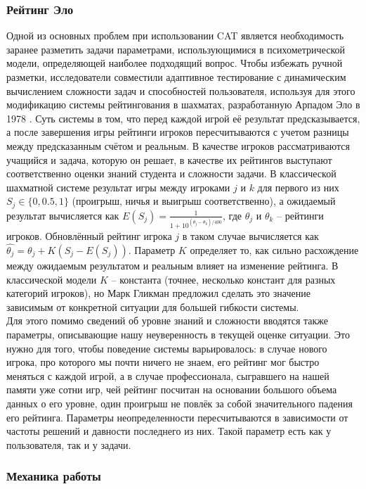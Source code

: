 \documentclass[14pt]{matmex-diploma}
\begin{document}
\subsubsection{Рейтинг Эло}
\indent Одной из основных проблем при использовании CAT является необходимость заранее разметить задачи параметрами, использующимися в психометрической модели, определяющей наиболее подходящий вопрос. Чтобы избежать ручной разметки, исследователи совместили адаптивное тестирование с динамическим вычислением сложности задач и способностей пользователя, используя для этого модификацию системы рейтингования в шахматах, разработанную Арпадом Эло в 1978 \cite{elo1978rating}. Суть системы в том, что перед каждой игрой её результат предсказывается, а после завершения игры рейтинги игроков пересчитываются с учетом разницы между предсказанным счётом и реальным. В качестве игроков рассматриваются учащийся и задача, которую он решает, в качестве их рейтингов выступают соответственно оценки знаний студента и сложности задачи. В классической шахматной системе результат игры между игроками $j$ и $k$ для первого из них $S_j \in \{0, 0.5, 1\}$ (проигрыш, ничья и выигрыш соответственно), а ожидаемый результат вычисляется как $E(S_j) = \frac{1}{1 + 10 ^ {(\theta_j - \theta_k) / 400}}$, где $\theta_j$ и $\theta_k$ -- рейтинги игроков. Обновлённый рейтинг игрока $j$ в таком случае вычисляется как $\hat{\theta_j} = \theta_j + K(S_j - E(S_j))$. Параметр $K$ определяет то, как сильно расхождение между ожидаемым результатом и реальным влияет на изменение рейтинга. В классической модели $K$ -- константа (точнее, несколько констант для разных категорий игроков), но Марк Гликман предложил сделать это значение зависимым от конкретной ситуации\cite{glickman95} для большей гибкости системы.
\\\indent Для этого помимо сведений об уровне знаний и сложности вводятся также параметры, описывающие нашу неуверенность в текущей оценке ситуации. Это нужно для того, чтобы поведение системы варьировалось: в случае нового игрока, про которого мы почти ничего не знаем, его рейтинг мог быстро меняться с каждой игрой, а в случае профессионала, сыгравшего на нашей памяти уже сотни игр, чей рейтинг посчитан на основании большого объема данных о его уровне, один проигрыш не повлёк за собой значительного падения его рейтинга. Параметры неопределенности пересчитываются в зависимости от частоты решений и давности последнего из них. Такой параметр есть как у пользователя, так и у задачи.

\subsubsection{Механика работы}
\end{document}
